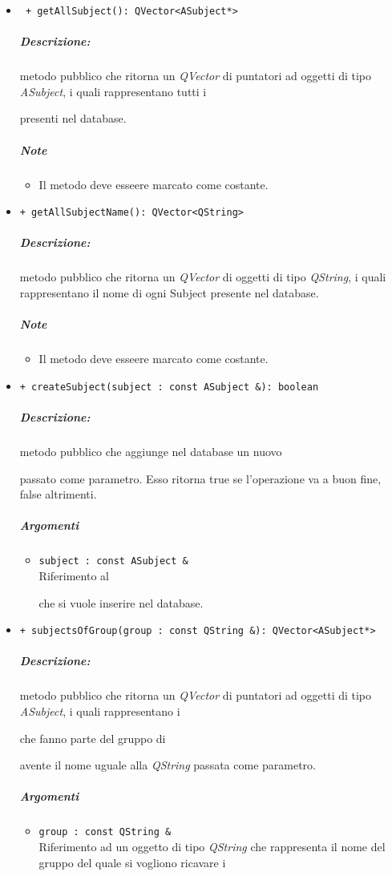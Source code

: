 \begin{itemize}
	\item \color{blue}\verb! + getAllSubject(): QVector<ASubject*>!
	\color{black} 
	\subparagraph{Descrizione:} metodo pubblico che ritorna un \textsl{QVector} di puntatori ad oggetti di tipo \textsl{ASubject}, i quali rappresentano tutti i \subject{} presenti nel database.
	\subparagraph{Note}
			\begin{itemize}
				\item Il metodo deve esseere marcato come costante.
			\end{itemize}
	
	\item\color{blue}\verb!+ getAllSubjectName(): QVector<QString>!
	\color{black} 
	\subparagraph{Descrizione:} metodo pubblico che ritorna un \textsl{QVector} di oggetti di tipo \textsl{QString}, i quali rappresentano il nome di ogni Subject\g{} presente nel database.
	\subparagraph{Note}
			\begin{itemize}
					\item Il metodo deve esseere marcato come costante.
			\end{itemize}
			
	
	\item \color{blue}\verb!+ createSubject(subject : const ASubject &): boolean!
	\color{black} 
	\subparagraph{Descrizione:} metodo pubblico che aggiunge nel database un nuovo \subject{} passato come parametro. Esso ritorna true se l'operazione va a buon fine, false altrimenti.
	\subparagraph{Argomenti}
	\begin{itemize}
	\item \color{RoyalPurple}\verb!subject : const ASubject &! \\ 
	\color{black}Riferimento al \subject{} che si vuole inserire nel database.
	\end{itemize}
	
	\item \color{blue}\verb!+ subjectsOfGroup(group : const QString &): QVector<ASubject*>!
	\color{black} 
	\subparagraph{Descrizione:} metodo pubblico che ritorna un \textsl{QVector} di puntatori ad oggetti di tipo \textsl{ASubject}, i quali rappresentano i \subject{} che fanno parte del gruppo di \subject{} avente il nome uguale alla \textsl{QString} passata come parametro.
	\subparagraph{Argomenti}
	\begin{itemize}
		\item \color{RoyalPurple}\verb!group : const QString &! \\ 
		\color{black}Riferimento ad un oggetto di tipo \textsl{QString} che rappresenta il nome del gruppo del quale si vogliono ricavare i \subject{}
	\end{itemize}
	

\end{itemize}
